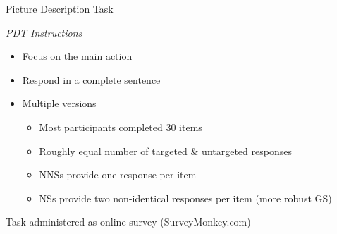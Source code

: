 \documentclass[final,t]{beamer}
\begin{document}
\begin{frame}{}
\begin{columns}[t]
\begin{column}{.33\linewidth}
\begin{block}{Picture Description Task}
\begin{center}
\begin{minipage}{.85\textwidth}
\begin{center}
  \textit{PDT Instructions}
\end{center}
\begin{center}
  \begin{minipage}{.4\textwidth}
    \begin{itemize}
    \item Focus on the main action
    \item Respond in a complete sentence
    \end{itemize}
  \end{minipage}
\end{center}

\begin{itemize}
	\item Multiple versions
	\begin{itemize}
		\item Most participants completed 30 items
		\item Roughly equal number of targeted \& untargeted responses %
		\item NNSs provide one response per item
		\item NSs provide two non-identical responses per item (more robust GS)
	\end{itemize}
\end{itemize}

\begin{center}
  Task administered as online survey (SurveyMonkey.com)
\end{center}

\end{minipage}
\end{center}
\vspace{-.5em}
\end{block}



\end{column}
\end{columns}
\end{frame}
\end{document}
